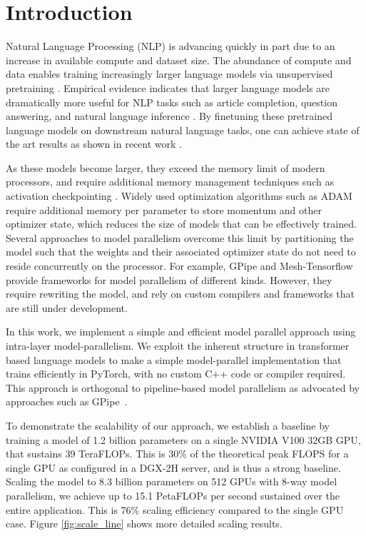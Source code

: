 \section{Introduction}

Natural Language Processing (NLP) is advancing quickly in part due to an increase in available compute and dataset size. The abundance of compute and data enables training increasingly larger language models via unsupervised pretraining \citep{devlin2018bert,Radford2019GPT2}. Empirical evidence indicates that larger language models are dramatically more useful for NLP tasks such as article completion, question answering, and natural language inference \cite{ALBERT2019,T5}. By finetuning these pretrained language models on downstream natural language tasks, one can achieve state of the art results as shown in recent work \cite{devlin2018bert, ELMo, Howard2018ULMFIT, Radford2018GPT, Radford2017Sentiment, Le2016seq2seqtransfer, roberta,transformerxl,xlnet,mtdnn,ALBERT2019}. 
    
As these models become larger, they exceed the memory limit of modern processors, and require additional memory management techniques such as activation checkpointing \citep{activation_checkpointing}. Widely used optimization algorithms such as ADAM require additional memory per parameter to store momentum and other optimizer state, which reduces the size of models that can be effectively trained. Several approaches to model parallelism overcome this limit by partitioning the model such that the weights and their associated optimizer state do not need to reside concurrently on the processor. For example, GPipe \cite{GPipe} and Mesh-Tensorflow \cite{mesh_tf} provide frameworks for model parallelism of different kinds. However, they require rewriting the model, and rely on custom compilers and frameworks that are still under development.
    
In this work,  we implement a simple and efficient model parallel approach using intra-layer model-parallelism. We exploit the inherent structure in transformer based language models to make a simple model-parallel implementation that trains efficiently in PyTorch, with no custom C++ code or compiler required. This approach is orthogonal to pipeline-based model parallelism as advocated by approaches such as GPipe~\cite{GPipe}. 
    
To demonstrate the scalability of our approach, we establish a baseline by training a model of 1.2 billion parameters on a single NVIDIA V100 32GB GPU, that sustains 39 TeraFLOPs. This is 30\% of the theoretical peak FLOPS for a single GPU as configured in a DGX-2H server, and is thus a strong baseline. Scaling the model to 8.3 billion parameters on 512 GPUs with 8-way model parallelism, we achieve up to 15.1 PetaFLOPs per second sustained over the entire application. This is 76\% scaling efficiency compared to the single GPU case. Figure \ref{fig:scale_line} shows more detailed scaling results.
    
